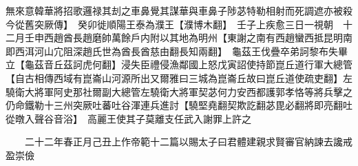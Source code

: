 無來意韓華將招歌邏禄其刦之車鼻覺其謀華與車鼻子陟苾特勒相射而死調遮亦被殺今從舊突厥傳】　癸卯徙順陽王泰為濮王【濮博木翻】　壬子上疾愈三日一視朝　十二月壬申西趙酋長趙磨帥萬餘戶内附以其地為明州【東謝之南有西趙蠻西抵昆明南即西洱河山宂阻深趙氏世為酋長酋慈由翻長知兩翻】　龜茲王伐疊卒弟訶黎布失畢立【龜茲音丘茲訶虎何翻】浸失臣禮侵漁鄰國上怒戊寅詔使持節崑丘道行軍大總管【自古相傳西域有崑崙山河源所出又爾雅曰三城為崑崙丘故曰崑丘道使疏吏翻】左驍衛大將軍阿史那社爾副大總管左驍衛大將軍契苾何力安西都護郭孝恪等將兵擊之仍命鐵勒十三州突厥吐蕃吐谷渾連兵進討【驍堅堯翻契欺訖翻苾毘必翻將即亮翻吐從暾入聲谷音浴】　高麗王使其子莫離支任武入謝罪上許之

　　二十二年春正月己丑上作帝範十二篇以賜太子曰君體建親求賢審官納諫去讒戒盈崇儉